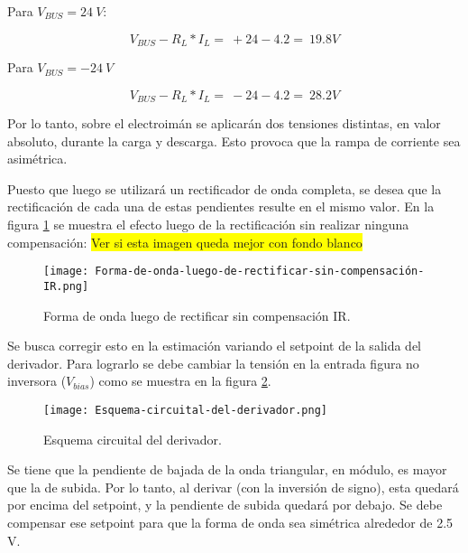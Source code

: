 \noindent Para $V_{BUS}=24\ V$:

\begin{equation} \label{eq_Vbus-didt-RL-3}
	V_{BUS}-R_L*I_L=\ +24-4.2=\ 19.8V
\end{equation}

\noindent Para $V_{BUS}=-24\ V$

\begin{equation} \label{eq_Vbus-didt-RL-4}
	V_{BUS}-R_L*I_L=\ -24-4.2=\ 28.2V
\end{equation}

\noindent Por lo tanto, sobre el electroim\'{a}n se aplicar\'{a}n dos tensiones distintas, en valor absoluto, durante la carga y descarga. Esto provoca que la rampa de corriente sea asim\'{e}trica.

\noindent Puesto que luego se utilizar\'{a} un rectificador de onda completa, se desea que la rectificaci\'{o}n de cada una de estas pendientes resulte en el mismo valor. En la figura \ref{fig:img_Forma-de-onda-luego-de-rectificar-sin-compensación-IR} se muestra el efecto luego de la rectificaci\'{o}n sin realizar ninguna compensaci\'{o}n:
\colorbox{yellow}{Ver si esta imagen queda mejor con fondo blanco}
\begin{figure}[H]
	\centering
	\texttt{[image: Forma-de-onda-luego-de-rectificar-sin-compensación-IR.png]}
	\caption{Forma de onda luego de rectificar sin compensación IR.}
	\label{fig:img_Forma-de-onda-luego-de-rectificar-sin-compensación-IR}
\end{figure}

\noindent Se busca corregir esto en la estimaci\'{o}n variando el setpoint de la salida del derivador. Para lograrlo se debe cambiar la tensi\'{o}n en la entrada figura no inversora ($V_{bias}$) como se muestra en la figura \ref{fig:img_Esquema-circuital-del-derivador}. 

\begin{figure}[H]
	\centering
	\texttt{[image: Esquema-circuital-del-derivador.png]}
	\caption{Esquema circuital del derivador.}
	\label{fig:img_Esquema-circuital-del-derivador}
\end{figure}

\noindent Se tiene que la pendiente de bajada de la onda triangular, en m\'{o}dulo, es mayor que la de subida. Por lo tanto, al derivar (con la inversi\'{o}n de signo), esta quedar\'{a} por encima del setpoint, y la pendiente de subida quedar\'{a} por debajo. Se debe compensar ese setpoint para que la forma de onda sea sim\'{e}trica alrededor de 2.5 V. 

